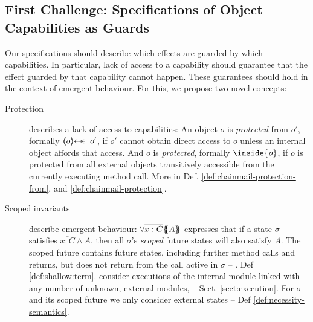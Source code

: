 



\subsection{First Challenge: Specifications of Object Capabilities as Guards}
\label{s:approach:necopers}


Our specifications should describe {which effects are guarded by which capabilities}. 
In particular, lack of access to {a capability  should} guarantee  that {the effect guarded by that capability cannot happen.}
  {These guarantees should hold  in the context of   emergent behaviour.}   
For this, we propose two %
{novel concepts}:

 
\begin{description}
\item[Protection] describes a lack of access to capabilities: An object $o$ is \emph{protected} from $o'$, formally $\protectedFrom {o} {o'}$,  if $o'$ cannot obtain direct access to $o$ unless an internal object affords that access. %
And $o$ is \emph{protected}, formally ${\inside{\prg{\it{o}}}}$, if $o$ is protected from all external objects transitively accessible from the currently executing method call. More in Def. \ref{def:chainmail-protection-from}, and \ref{def:chainmail-protection}.

\item[{Scoped invariants}] describe emergent behaviour:  {$\forall {\overline{x:C}}{{\{}\!\!{\{}}{A}{{\}}\!\!{\}}}$} expresses that if a 
{state} $\sigma$ 
  satisfies ${\overline{x:C}}  \wedge A$, then all $\sigma$'s \emph{scoped} future  states will  {also} satisfy  {$A$}. 
The scoped future contains future states, including further method calls and returns, but {does not return} from the call active in $\sigma$ --  \cf. Def  \ref{def:shallow:term}.
 consider executions of the internal module linked with any number of unknown, external modules,
-- \cf Sect. \ref{sect:execution}.
 For $\sigma$ and its scoped future   we only consider external states -- \cf Def \ref{def:necessity-semantics}.

\end{description}

